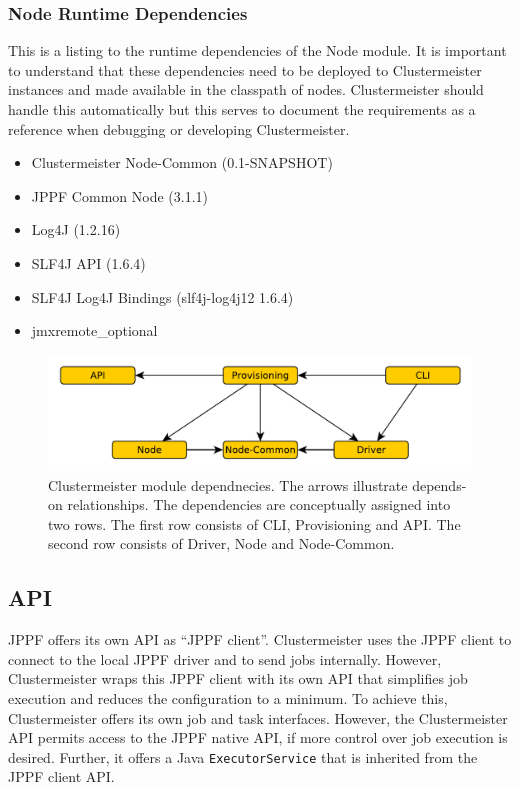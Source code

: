 \documentclass[english]{uzhpub}
\begin{document}
\subsubsection{Node Runtime Dependencies}
This is a listing to the runtime dependencies of the Node module. It is important to understand that these dependencies need to be deployed to Clustermeister instances and made available in the classpath of nodes. Clustermeister should handle this automatically but this serves to document the requirements as a reference when debugging or developing Clustermeister.

\begin{itemize}
 \item Clustermeister Node-Common (0.1-SNAPSHOT)
 \item JPPF Common Node (3.1.1)
 \item Log4J (1.2.16)
 \item SLF4J API (1.6.4)
 \item SLF4J Log4J Bindings (slf4j-log4j12 1.6.4)
 \item jmxremote\_optional
\end{itemize}

\begin{figure}[hp]
\centering
\includegraphics[scale=0.7]{images/module-deps.pdf}
\caption{Clustermeister module dependnecies. The arrows illustrate depends-on relationships. The dependencies are conceptually assigned into two rows. The first row consists of CLI, Provisioning and API. The second row consists of Driver, Node and Node-Common.}
\label{fig:deps}
\end{figure}

\subsection{API}

JPPF offers its own API as ``JPPF client''. Clustermeister uses the JPPF client to connect to the local JPPF driver and to send jobs internally. However, Clustermeister wraps this JPPF client with its own API that simplifies job execution and reduces the configuration to a minimum. To achieve this, Clustermeister offers its own job and task interfaces. However, the Clustermeister API permits access to the JPPF native API, if more control over job execution is desired. Further, it offers a Java \texttt{ExecutorService} that is inherited from the JPPF client API.
\end{document}
